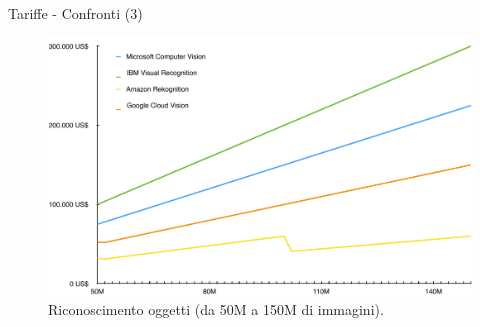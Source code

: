%
\begin{frame}[t]{Tariffe - Confronti (3)}
	\begin{figure}[h]
	\centering
	    \includegraphics[width=.6\paperwidth,keepaspectratio=true]{../../doc/img/grafico3}
		{\tiny \caption{Riconoscimento oggetti (da 50M a 150M di immagini).}}
		\label{fig:tariffe-riconoscimento-oggetti-50-150M}
	\end{figure}
\end{frame}
%
